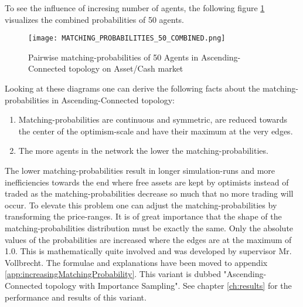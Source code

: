 \documentclass[Bachelorarbeit.tex]{subfiles}
\begin{document}
To see the influence of incresing number of agents, the following figure \ref{fig:MATCHING_PROBABILITIES_50_COMBINED} visualizes the combined probabilities of 50 agents.

\begin{figure}[H]
	\centering
  \texttt{[image: MATCHING\_PROBABILITIES\_50\_COMBINED.png]}
	\caption{Pairwise matching-probabilities of 50 Agents in Ascending-Connected topology on Asset/Cash market}
	\label{fig:MATCHING_PROBABILITIES_50_COMBINED}
\end{figure}

Looking at these diagrams one can derive the following facts about the matching-probabilities in Ascending-Connected topology:
\begin{enumerate}
\item Matching-probabilities are continuous and symmetric, are reduced towards the center of the optimism-scale and have their maximum at the very edges.
\item The more agents in the network the lower the matching-probabilities.
\end{enumerate}

The lower matching-probabilities result in longer simulation-runs and more inefficiencies towards the end where free assets are kept by optimists instead of traded as the matching-probabilities decrease so much that no more trading will occur. To elevate this problem one can adjust the matching-probabilities by transforming the price-ranges. It is of great importance that the shape of the matching-probabilities distribution must be exactly the same. Only the absolute values of the probabilities are increased where the edges are at the maximum of 1.0. This is mathematically quite involved and was developed by supervisor Mr. Vollbrecht. The formulae and explanations have been moved to appendix \ref{app:increasingMatchingProbability}.
\medskip
This variant is dubbed "Ascending-Connected topology with Importance Sampling". See chapter \ref{ch:results} for the performance and results of this variant.
\end{document}
